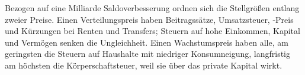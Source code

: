 Bezogen auf eine Milliarde Saldoverbesserung ordnen sich die Stellgrößen
entlang zweier Preise. Einen Verteilungspreis haben Beitragssätze, Umsatzsteuer,
\COz-Preis und Kürzungen bei Renten und Transfers; Steuern auf hohe
Einkommen, Kapital und Vermögen senken die Ungleichheit. Einen Wachstumspreis
haben alle, am geringsten die Steuern auf Haushalte mit niedriger
Konsumneigung, langfristig am höchsten die Körperschaftsteuer, weil sie über
das private Kapital wirkt.
